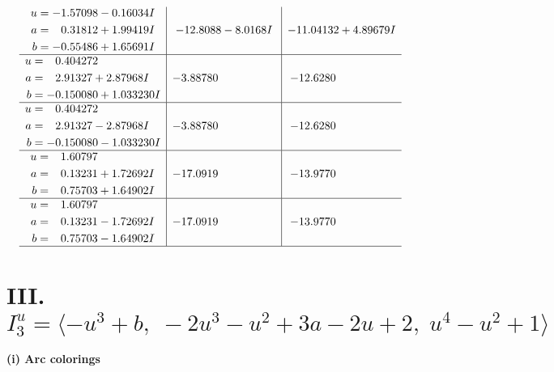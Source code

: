 \documentclass[1p]{elsarticle_modified}
\theoremstyle{definition}
\begin{document}
$$\begin{array}{c|c|c}
\begin{aligned}
u &= -1.57098 - 0.16034 I \\
a &= \phantom{-}0.31812 + 1.99419 I \\
b &= -0.55486 + 1.65691 I\end{aligned}
 & -12.8088 - 8.0168 I & -11.04132 + 4.89679 I \\ \hline\begin{aligned}
u &= \phantom{-}0.404272\phantom{ +0.000000I} \\
a &= \phantom{-}2.91327 + 2.87968 I \\
b &= -0.150080 + 1.033230 I\end{aligned}
 & -3.88780\phantom{ +0.000000I} & -12.6280\phantom{ +0.000000I} \\ \hline\begin{aligned}
u &= \phantom{-}0.404272\phantom{ +0.000000I} \\
a &= \phantom{-}2.91327 - 2.87968 I \\
b &= -0.150080 - 1.033230 I\end{aligned}
 & -3.88780\phantom{ +0.000000I} & -12.6280\phantom{ +0.000000I} \\ \hline\begin{aligned}
u &= \phantom{-}1.60797\phantom{ +0.000000I} \\
a &= \phantom{-}0.13231 + 1.72692 I \\
b &= \phantom{-}0.75703 + 1.64902 I\end{aligned}
 & -17.0919\phantom{ +0.000000I} & -13.9770\phantom{ +0.000000I} \\ \hline\begin{aligned}
u &= \phantom{-}1.60797\phantom{ +0.000000I} \\
a &= \phantom{-}0.13231 - 1.72692 I \\
b &= \phantom{-}0.75703 - 1.64902 I\end{aligned}
 & -17.0919\phantom{ +0.000000I} & -13.9770\phantom{ +0.000000I}\\
 \hline 
 \end{array}$$\newpage\newpage\renewcommand{\arraystretch}{1}
\centering \section*{III. $I^u_{3}= \langle - u^3+b,\;-2 u^3- u^2+3 a-2 u+2,\;u^4- u^2+1 \rangle$}
\flushleft \textbf{(i) Arc colorings}\\
\end{document}
